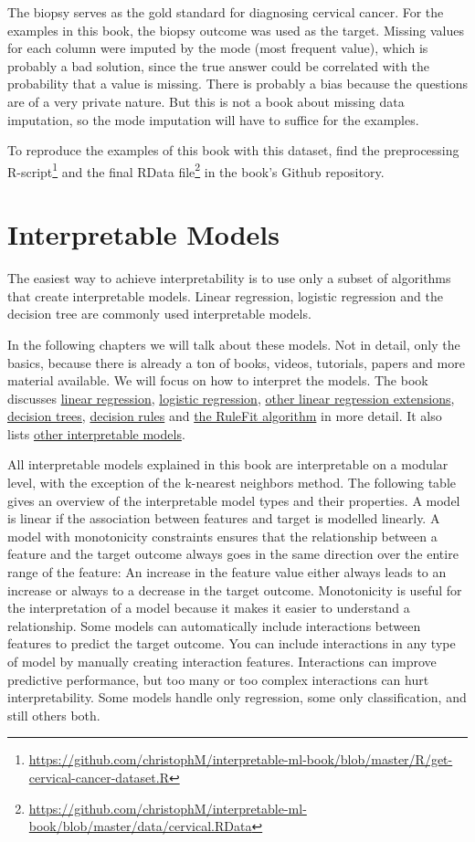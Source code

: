 \documentclass[
  11pt,
]{scrbook}
\renewcommand{\href}[2]{#2\footnote{\url{#1}}}
\begin{document}
The biopsy serves as the gold standard for diagnosing cervical cancer.
For the examples in this book, the biopsy outcome was used as the target.
Missing values for each column were imputed by the mode (most frequent value), which is probably a bad solution, since the true answer could be correlated with the probability that a value is missing.
There is probably a bias because the questions are of a very private nature.
But this is not a book about missing data imputation, so the mode imputation will have to suffice for the examples.

To reproduce the examples of this book with this dataset, find the
\href{https://github.com/christophM/interpretable-ml-book/blob/master/R/get-cervical-cancer-dataset.R}{preprocessing R-script} and the
\href{https://github.com/christophM/interpretable-ml-book/blob/master/data/cervical.RData}{final RData file} in the book's Github repository.

\hypertarget{simple}{%
\chapter{Interpretable Models}\label{simple}}

The easiest way to achieve interpretability is to use only a subset of algorithms that create interpretable models.
Linear regression, logistic regression and the decision tree are commonly used interpretable models.

In the following chapters we will talk about these models.
Not in detail, only the basics, because there is already a ton of books, videos, tutorials, papers and more material available.
We will focus on how to interpret the models.
The book discusses \protect\hyperlink{limo}{linear regression}, \protect\hyperlink{logistic}{logistic regression}, \protect\hyperlink{extend-lm}{other linear regression extensions}, \protect\hyperlink{tree}{decision trees}, \protect\hyperlink{rules}{decision rules} and \protect\hyperlink{rulefit}{the RuleFit algorithm} in more detail.
It also lists \protect\hyperlink{other-interpretable}{other interpretable models}.

All interpretable models explained in this book are interpretable on a modular level, with the exception of the k-nearest neighbors method.
The following table gives an overview of the interpretable model types and their properties.
A model is linear if the association between features and target is modelled linearly.
A model with monotonicity constraints ensures that the relationship between a feature and the target outcome always goes in the same direction over the entire range of the feature:
An increase in the feature value either always leads to an increase or always to a decrease in the target outcome.
Monotonicity is useful for the interpretation of a model because it makes it easier to understand a relationship.
Some models can automatically include interactions between features to predict the target outcome.
You can include interactions in any type of model by manually creating interaction features.
Interactions can improve predictive performance, but too many or too complex interactions can hurt interpretability.
Some models handle only regression, some only classification, and still others both.
\end{document}
